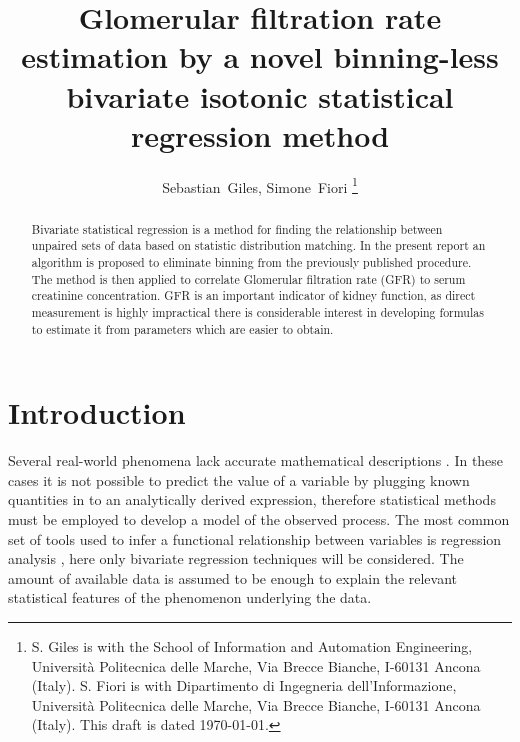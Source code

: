 \documentclass[10pt,final]{siamltex}
\begin{document}
\title{Glomerular filtration rate estimation by a novel binning-less bivariate isotonic statistical regression method}
\author{Sebastian~Giles, Simone~Fiori%
\thanks{S. Giles is with the School of Information and Automation Engineering,
Universit\`{a} Politecnica delle Marche,
Via Brecce Bianche, I-60131 Ancona (Italy).
\newline\indent
S. Fiori is with Dipartimento di Ingegneria dell'Informazione,
Universit\`{a} Politecnica delle Marche,
Via Brecce Bianche, I-60131 Ancona (Italy).
\newline\indent
This draft is dated \today.}}
\maketitle
\def\bbbr{\mathbb{R}}
\def\bbbx{\mathbb{X}}
\def\bbby{\mathbb{Y}}
\def\mdef{{\stackrel{{\mathrm{def}}}{=}}}
\renewcommand*{\thefootnote}{\fnsymbol{footnote}}
\def\to{\mathbf{\ to\ }}
\setcounter{footnote}{1}
%
%
\begin{abstract}
  Bivariate statistical regression is a method for finding the relationship between unpaired sets of data based on statistic distribution matching. In the present report an  algorithm is proposed to eliminate binning from the previously published procedure. The method is then applied to correlate Glomerular filtration rate (GFR) to serum creatinine concentration. GFR is an important indicator of kidney function, as direct measurement is highly impractical there is considerable interest in developing formulas to estimate it from parameters which are easier to obtain.
\end{abstract}
%
\section{Introduction}\label{intro}
Several real-world phenomena lack accurate mathematical descriptions \cite{strontium, seismic}. In these cases it is not possible to predict the value of a variable by plugging known quantities in to an analytically derived expression, therefore statistical methods must be employed to develop a model of the observed process. The most common set of tools used to infer a functional relationship between variables is regression analysis \cite{control, ts}, here only bivariate regression techniques will be considered. The amount of available data is assumed to be enough to explain the relevant statistical features of the phenomenon underlying the data.
\end{document}
